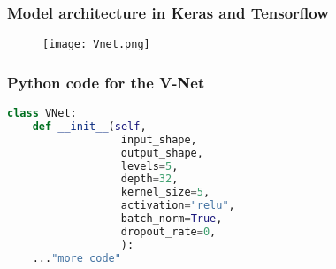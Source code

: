 \begin{frame}
  \frametitle{Model architecture in Keras and Tensorflow}
  \begin{center}
      \begin{figure}
      \texttt{[image: Vnet.png]}    %
      \end{figure}
  \end{center}
\end{frame}

\begin{frame}[fragile]
  \frametitle{Python code for the V-Net}
	\begin{lstlisting}[language=Python,caption={Definition of the constructor for the VNet class \parencite{rapportstagevnet}.},breaklines]
  class VNet:
    def __init__(self,
                  input_shape,
                  output_shape,                  
                  levels=5,
                  depth=32,
                  kernel_size=5, 
                  activation="relu",
                  batch_norm=True,
                  dropout_rate=0, 
                  ):
    ..."more code"
  \end{lstlisting}
\end{frame}

